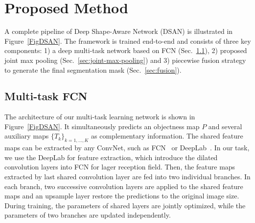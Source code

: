 \section{Proposed Method}
\label{sec:method}

A complete pipeline of Deep Shape-Aware Network (DSAN) is illustrated in Figure~\ref{FigDSAN}.
The framework is trained end-to-end and consists of three key components:
1) a deep multi-task network based on FCN (Sec.~\ref{sec:multi-task-fcn}),
2) proposed joint max pooling (Sec.~\ref{sec:joint-max-pooling}) and
3) piecewise fusion strategy to generate the final segmentation mask (Sec.~\ref{sec:fusion}).

\subsection{Multi-task FCN}
\label{sec:multi-task-fcn}

The architecture of our multi-task learning network is shown in Figure~\ref{FigDSAN}.
It simultaneously predicts an objectness map $P$ and several auxiliary maps $\{T_k\}_{k=1,\ldots,K}$ as complementary information.
The shared feature maps can be extracted by any ConvNet, such as FCN~\cite{Long2015a} or DeepLab~\cite{Chen2014a}.
In our task, we use the DeepLab for feature extraction, which introduce the dilated convolution layers into FCN for lager reception field.
Then, the feature maps extracted by last shared convolution layer are fed into two individual branches.
In each branch, two successive convolution layers are applied to the shared feature maps and an upsample layer restore the predictions to the original image size.
During training, the parameters of shared layers are jointly optimized, while the parameters of two branches are updated independently.

